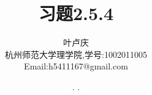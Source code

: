\documentclass[a4paper, 12pt]{article} %
\makeatletter
\renewcommand{\maketitle}{ %
  \renewcommand\refname{参考文献}
  \newcommand{\D}{\displaystyle}\newcommand{\ri}{\Rightarrow}
  \newcommand{\ds}{\displaystyle} \renewcommand{\ni}{\noindent}
  \newcommand{\pa}{\partial} \newcommand{\Om}{\Omega}
  \newcommand{\om}{\omega} \newcommand{\sik}{\sum_{i=1}^k}
  \newcommand{\vov}{\Vert\omega\Vert} \newcommand{\Umy}{U_{\mu_i,y^i}}
  \newcommand{\lamns}{\lambda_n^{^{\scriptstyle\sigma}}}
  \newcommand{\chiomn}{\chi_{_{\Omega_n}}}
  \newcommand{\ullim}{\underline{\lim}} \newcommand{\bsy}{\boldsymbol}
  \newcommand{\mvb}{\mathversion{bold}} \newcommand{\la}{\lambda}
  \newcommand{\La}{\Lambda} \newcommand{\va}{\varepsilon}
  \newcommand{\be}{\beta} \newcommand{\al}{\alpha}
  \newcommand{\dis}{\displaystyle} \newcommand{\R}{{\mathbb R}}
  \newcommand{\N}{{\mathbb N}} \newcommand{\cF}{{\mathcal F}}
  \newcommand{\gB}{{\mathfrak B}} \newcommand{\eps}{\epsilon}
  \begin{flushright} %
    {\LARGE\@title} %
    
    \vspace{50pt} %
    
    {\large\@author} %
    \\\@date %
    
    \vspace{40pt} %
  \end{flushright}
}
\makeatother
\begin{document}
\begin{CJK}{UTF8}{gkai}
  \title{\textbf{习题2.5.4}} 
  \author{\small{叶卢庆}\\{\small{杭州师范大学理学院,学号:1002011005}}\\{\small{Email:h5411167@gmail.com}}} %
  \renewcommand{\today}{\number\year. \number\month. \number\day}
  \date{\today} %
  
  
  
  \maketitle %
  
  
  
  
  
  
  

\end{CJK}
\end{document}
